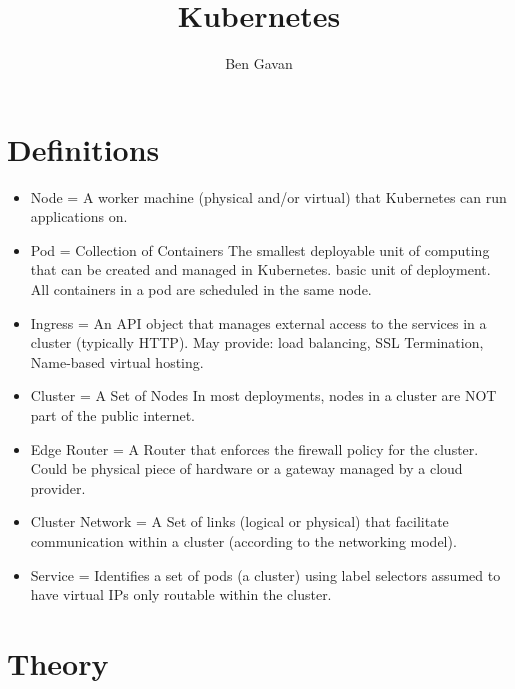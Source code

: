 \documentclass[]{article}
\title{Kubernetes}
\author{Ben Gavan}
\newcommand{\<}{\guilsinglleft}
\renewcommand{\>}{\guilsinglright}
\begin{document}
\maketitle

\begin{abstract}

\end{abstract}
\section{Definitions}
\begin{itemize}
	\item Node = A worker machine (physical and/or virtual)  that Kubernetes can run applications on.
	
	\item Pod = Collection of Containers
	\subitem The smallest deployable unit of computing that can be created and managed in Kubernetes.
	\subitem basic unit of deployment.
	\subitem All containers in a pod are scheduled in the same node.
	
	\item Ingress = An API object that manages external access to the services in a cluster (typically HTTP).  May provide:
	\subitem load balancing,
	\subitem SSL Termination,
	\subitem Name-based virtual hosting.
	
	\item Cluster = A Set of Nodes
	\subitem In most deployments, nodes in a cluster are NOT part of the public internet.
	
	\item Edge Router = A Router that enforces the firewall policy for the cluster.
	\subitem Could be physical piece of hardware 
	\subitem or a gateway managed by a cloud provider.
	
	\item Cluster Network = A Set of links (logical or physical) that facilitate communication within a cluster (according to the networking model).
	
	\item Service =  Identifies a set of pods (a cluster)  using label selectors
	\subitem assumed to have virtual IPs only routable within the cluster.
\end{itemize}

\section{Theory}
\end{document}
